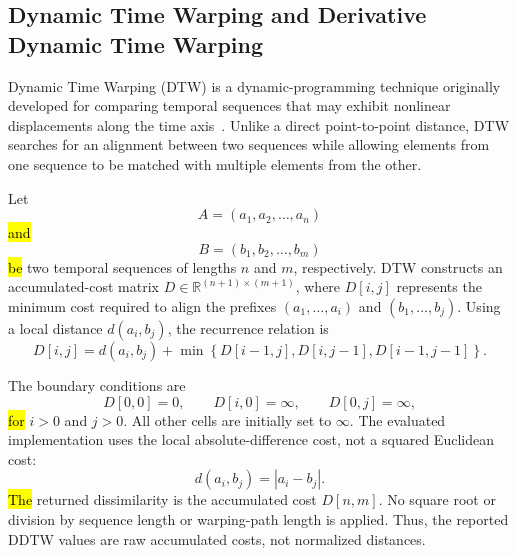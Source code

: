 \documentclass[mathematics,article,accept,moreauthors]{Definitions/mdpi}
\begin{document}
\subsection{Dynamic Time Warping and Derivative Dynamic Time Warping}

Dynamic Time Warping (DTW) is a dynamic-programming technique originally
developed for comparing temporal sequences that may exhibit nonlinear
displacements along the time axis~\cite{sakoe1978dynamic}. Unlike a direct
point-to-point distance, DTW searches for an alignment between two sequences
while allowing elements from one sequence to be matched with multiple
elements from the other.

Let
\begin{equation}
A = (a_1,a_2,\ldots,a_n)
\end{equation}
\hl{and} %
\begin{equation}
B = (b_1,b_2,\ldots,b_m)
\end{equation}
\hl{be} two temporal sequences of lengths $n$ and $m$, respectively. DTW constructs
an accumulated-cost matrix $D \in \mathbb{R}^{(n+1)\times(m+1)}$, where
$D[i,j]$ represents the minimum cost required to align the prefixes
$(a_1,\ldots,a_i)$ and $(b_1,\ldots,b_j)$. Using a local distance
$d(a_i,b_j)$, the recurrence relation is
\begin{equation}
D[i,j] =
d(a_i,b_j)
+
\min
\left\{
D[i-1,j],
D[i,j-1],
D[i-1,j-1]
\right\}.
\end{equation}

The boundary conditions are
\begin{equation}
D[0,0]=0,
\qquad
D[i,0]=\infty,
\qquad
D[0,j]=\infty,
\end{equation}
\hl{for} $i>0$ and $j>0$. All other cells are initially set to $\infty$.
The evaluated implementation uses the local absolute-difference cost,
not a squared Euclidean cost:
\begin{equation}
d(a_i,b_j)=|a_i-b_j|.
\label{eq:dtw_local_cost}
\end{equation}
\hl{The} %
 returned dissimilarity is the accumulated cost $D[n,m]$. No square root
or division by sequence length or warping-path length is applied. Thus, the
reported DDTW values are raw accumulated costs, not normalized distances.
\end{document}
